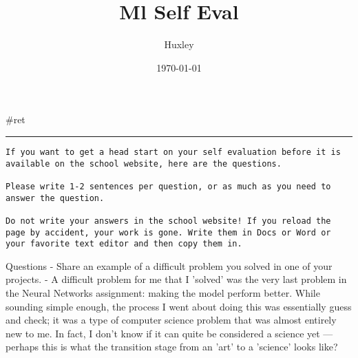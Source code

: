 \documentclass[letterpaper]{article}
\author{Huxley}
\date{\today}
\title{Ml Self Eval}
\renewcommand\maketitle{}
\begin{document}
\maketitle
\#ret

\noindent\rule{\textwidth}{0.5pt}

\begin{verbatim}
If you want to get a head start on your self evaluation before it is available on the school website, here are the questions.

Please write 1-2 sentences per question, or as much as you need to answer the question.

Do not write your answers in the school website! If you reload the page by accident, your work is gone. Write them in Docs or Word or your favorite text editor and then copy them in.
\end{verbatim}

Questions - Share an example of a difficult problem you solved in one of
your projects. - A difficult problem for me that I 'solved' was the very
last problem in the Neural Networks assignment: making the model perform
better. While sounding simple enough, the process I went about doing
this was essentially guess and check; it was a type of computer science
problem that was almost entirely new to me. In fact, I don't know if it
can quite be considered a science yet --- perhaps this is what the
transition stage from an 'art' to a 'science' looks like?
\end{document}
